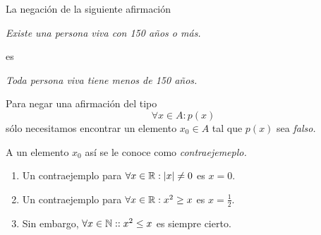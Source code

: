 \begin{resuelto}
  \label{lip:exmp:4.10.b}
  La negación de la siguiente afirmación
  \begin{center}
   \emph{Existe una persona viva con 150 a\~nos o más.}
  \end{center}
 es 
 \begin{center}
  \emph{Toda persona viva tiene menos de 150 a\~nos.}
 \end{center}

 \end{resuelto}

 \begin{observacion}
  Para negar una afirmación del tipo $$\forall x \in A: p(x)$$ sólo necesitamos encontrar un elemento $x_{0}\in A$ tal que $p(x)$ sea \emph{falso.}
  
  
  A un elemento $x_{0}$ así se le conoce como \emph{contraejemeplo.}
 \end{observacion}

 \begin{resuelto}
 \label{lip:4.11}
  \begin{enumerate}
   \item 
  Un contraejemplo para $\forall x \in \mathbb{R}: \left|x\right|\neq 0$ es $x=0.$  
   \item 
  Un contraejemplo para $\forall x \in \mathbb{R}: x^{2}\geq x$ es $x=\frac{1}{2}.$  
   \item 
  Sin embargo, $\forall x \in \mathbb{N}: : x^{2}\leq x$ es siempre cierto.
  \end{enumerate}

 \end{resuelto}





